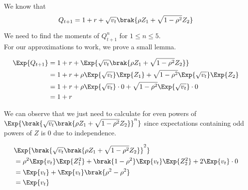 \appendix

We know that
\[
	Q_{t+1} = 1 + r + \sqrt{v_t}\brak{\rho Z_1 + \sqrt{1 - \rho^2} Z_2}
\]

We need to find the moments of \( Q_{t+1}^n \) for \( 1 \leq n \leq 5 \). \\
For our approximations to work, we prove a small lemma.





\begin{align*}
	\Exp{Q_{t+1}} &= 1 + r + \Exp{\sqrt{v_t}\brak{\rho Z_1 +
		\sqrt{1 - \rho^2} Z_2}} \\
	&= 1 + r + \rho \Exp{\sqrt{v_t}} \Exp{Z_1} + \sqrt{1 - \rho^2}
		\Exp{\sqrt{v_t}}\Exp{Z_2} \\
	&= 1 + r + \rho \Exp{\sqrt{v_t}} \cdot 0 + \sqrt{1 - \rho^2}
		\Exp{\sqrt{v_t}} \cdot 0 \\
	&= 1 + r
\end{align*}

We can observe that we just need to calculate for even powers of
\( \Exp{\brak{\sqrt{v_t}\brak{\rho Z_1 + \sqrt{1 - \rho^2} Z_2}}^n} \)
since expectations containing odd powers of \( Z \) is 0 due to independence.

\begin{align*}
	&\Exp{\brak{\sqrt{v_t}\brak{\rho Z_1 + \sqrt{1 - \rho^2} Z_2}}^2} \\
	& = \rho^2 \Exp{v_t} \Exp{Z_1^2} + \brak{1 - \rho^2} \Exp{v_t} \Exp{Z_2^2}
		+ 2\Exp{v_t} \cdot 0 \\
	&= \Exp{v_t} + \Exp{v_t}\brak{\rho^2 - \rho^2} \\
	&= \Exp{v_t}
\end{align*}

